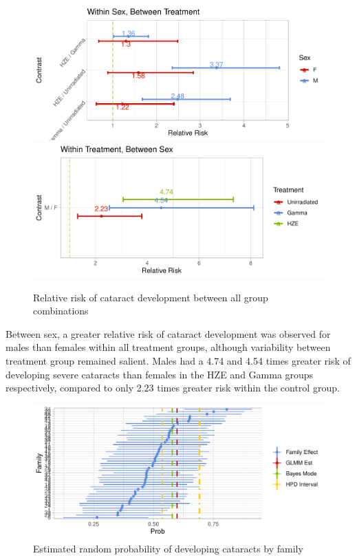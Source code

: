 \documentclass[12pt]{article}
\begin{document}
\begin{figure}[H]

{\centering \includegraphics[width=0.5\linewidth]{bookdown_report_files/figure-latex/RR-1} \includegraphics[width=0.5\linewidth]{bookdown_report_files/figure-latex/RR-2} 

}

\caption{Relative risk of cataract development between all group combinations}\label{fig:RR}
\end{figure}

Between sex, a greater relative risk of cataract development was observed for males than females within all treatment groups, although variability between treatment group remained salient. Males had a 4.74 and 4.54 times greater risk of developing severe cataracts than females in the HZE and Gamma groups respectively, compared to only 2.23 times greater risk within the control group.

\begin{figure}[H]

{\centering \includegraphics{bookdown_report_files/figure-latex/re-1} 

}

\caption{Estimated random probability of developing cataracts by family}\label{fig:re}
\end{figure}
\end{document}
